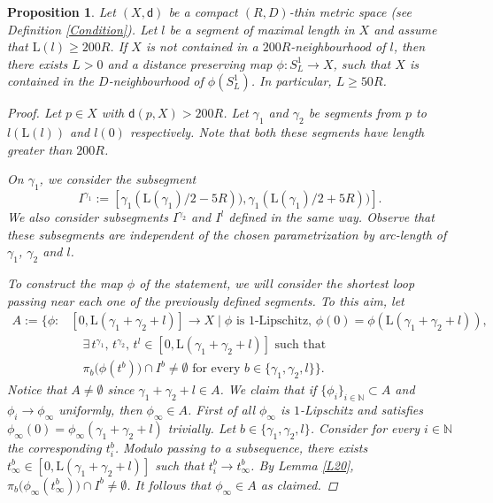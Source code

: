 \documentclass[10pt]{article}
\newtheorem{proposition}[thm]{Proposition}
\theoremstyle{definition}
\newcommand{\bb}[1]{\mathbb{#1}}
\newcommand{\length}{\mathrm{L}}
\newcommand{\sd}{\mathsf{d}}
\begin{document}
\begin{proposition} \label{IsometriaCerchio}
    Let $(X,\sd)$ be a compact $(R,D)$-thin metric space (see Definition \ref{Condition}).
     Let $l$ be a segment of maximal length in $X$ and assume that $\length(l) \geq 200R$. If $X$ is not contained in a $200R$-neighbourhood of $l$, then there exists $L>0$ and a distance preserving map $\phi:S^1_L \to X$, such that $X$ is contained in the $D$-neighbourhood of $\phi(S^1_L)$. In particular, $L \geq 50R$.
     \begin{proof}
         Let $p \in X$ with $\sd(p,X)>200R$. Let $\gamma_1$ and $\gamma_2$ be segments from $p$ to $l(\length(l))$ and  $l(0)$ respectively. Note that both these segments have length greater than $200R$.

         On $\gamma_1$, we consider the subsegment
         \[
         I^{\gamma_1}:=[\gamma_1(\length(\gamma_1)/2-5R)),\gamma_1(\length(\gamma_1)/2+5R))].
         \]
         We also consider subsegments $I^{\gamma_2}$ and $I^{l}$ defined in the same way. Observe that these subsegments are independent of the chosen  parametrization by arc-length of $\gamma_1$, $\gamma_2$ and $l$.
         
         To construct the map $\phi$ of the statement, we will consider the shortest loop passing near each one of the previously defined segments. To this aim, let
         \begin{align*}
         A:=\Big\{ \phi: &[0,\length(\gamma_1+\gamma_2+l)] \to X\mid \phi \text{ is } 1\text{-Lipschitz, } \phi(0)=\phi(\length(\gamma_1+\gamma_2+l)),
         \\
         & \quad
         \exists \, 
           t^{\gamma_1} , \,t^{\gamma_2} , 
           \, t^l \in [0, \length(\gamma_1+\gamma_2+l)] \text{ such that }
          \\
          & \quad \pi_{b}\big(\phi(t^b)\big) \cap I^b \neq \emptyset  \text{ for every } b \in \{\gamma_1,\gamma_2,l\} \Big\}.
         \end{align*}
         Notice that $A \neq \emptyset$ since $\gamma_1+\gamma_2+l \in A$. We claim that if $\{\phi_i\}_{i \in \bb{N}} \subset A$ and $\phi_i \to \phi_\infty$ uniformly, then $\phi_\infty \in A$. First of all $\phi_\infty$ is $1$-Lipschitz and satisfies $\phi_\infty(0)=\phi_\infty(\gamma_1+\gamma_2+l)$ trivially. Let $b \in \{\gamma_1,\gamma_2,l\}$. Consider for every $i \in \bb{N}$ the corresponding $t_{i}^{b}$. Modulo passing to a subsequence, there exists $t_{\infty}^{b} \in [0,\length(\gamma_1+\gamma_2+l)]$ such that $t_{i}^{b} \to t_{\infty}^{b}$. By Lemma \ref{L20}, $\pi_{b}\big( \phi_\infty(t_{\infty}^b) \big) \cap I^{b} \neq \emptyset$. 
         It follows that $\phi_\infty \in A$ as claimed.


\end{proof}
\end{proposition}
\end{document}

